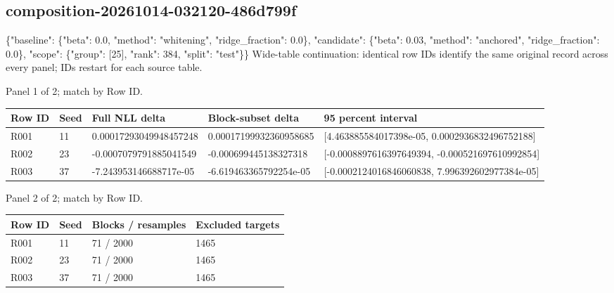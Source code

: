 \documentclass[10pt]{article}
\begin{document}
\subsection{composition-20261014-032120-486d799f}
\{"baseline": \{"beta": 0.0, "method": "whitening", "ridge\_fraction": 0.0\}, "candidate": \{"beta": 0.03, "method": "anchored", "ridge\_fraction": 0.0\}, "scope": \{"group": [25], "rank": 384, "split": "test"\}\}
Wide-table continuation: identical row IDs identify the same original record across every panel; IDs restart for each source table.
\par\noindent Panel 1 of 2; match by Row ID.
{\scriptsize\setlength{\tabcolsep}{2pt}
\begin{longtable}{p{}p{}p{}p{}p{}}
Row ID & Seed & Full NLL delta & Block-subset delta & 95 percent interval \\
\hline\endhead
R001 & 11 & 0.00017293049948457248 & 0.00017199932360958685 & [4.463885584017398e-05, 0.0002936832496752188] \\
R002 & 23 & -0.0007079791885041549 & -0.000699445138327318 & [-0.0008897616397649394, -0.000521697610992854] \\
R003 & 37 & -7.243953146688717e-05 & -6.619463365792254e-05 & [-0.0002124016846060838, 7.996392602977384e-05] \\
\end{longtable}}
\par\noindent Panel 2 of 2; match by Row ID.
{\scriptsize\setlength{\tabcolsep}{2pt}
\begin{longtable}{p{}p{}p{}p{}}
Row ID & Seed & Blocks / resamples & Excluded targets \\
\hline\endhead
R001 & 11 & 71 / 2000 & 1465 \\
R002 & 23 & 71 / 2000 & 1465 \\
R003 & 37 & 71 / 2000 & 1465 \\
\end{longtable}}
\end{document}
